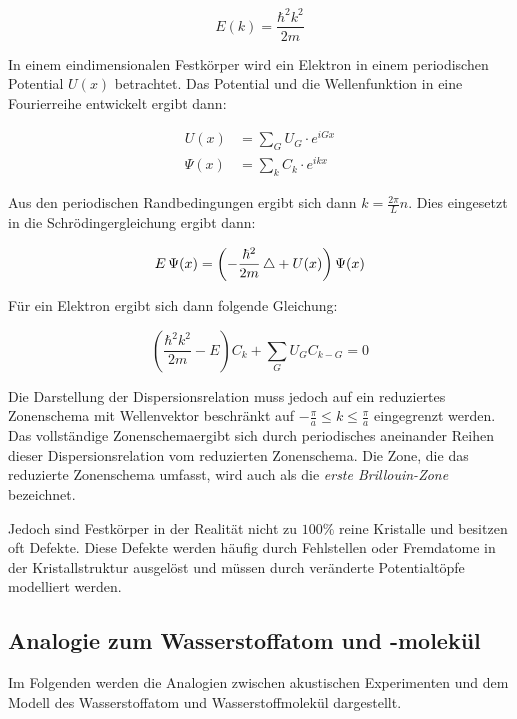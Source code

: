 \begin{equation}
    E(k) = \frac{\hbar^2 k^2}{2 m}
    \label{eqn:disp}
\end{equation}

In einem eindimensionalen Festkörper wird ein Elektron in einem periodischen Potential $U(x)$ betrachtet. Das Potential und die Wellenfunktion in eine Fourierreihe entwickelt ergibt dann:

\begin{align}
    U (x) &= \sum_G U_G \cdot e^{iGx} \\
    \Psi (x) &= \sum_k C_k \cdot e^{ikx}
\end{align}

Aus den periodischen Randbedingungen ergibt sich dann $k = \frac{2 \pi}{L} n$. Dies eingesetzt in die Schrödingergleichung ergibt dann:

\begin{equation}
    E \, \Psi (x) = \left( - \frac{\hbar^2}{2m} \mathop{}\!\mathbin\bigtriangleup + U (x) \right) \Psi (x)
    \label{eqn:fest_schroed}
\end{equation}

Für ein Elektron ergibt sich dann folgende Gleichung:

\begin{equation}
    \left( \frac{\hbar^2 k^2}{2m} - E \right) C_k + \sum_G U_G C_{k-G} = 0
    \label{eqn:fest_el}
\end{equation}

Die Darstellung der Dispersionsrelation muss jedoch auf ein reduziertes Zonenschema mit Wellenvektor beschränkt auf $- \frac{\pi}{a} \leq k \leq \frac{\pi}{a}$ eingegrenzt werden. Das vollständige Zonenschemaergibt sich durch periodisches aneinander Reihen dieser Dispersionsrelation vom reduzierten Zonenschema. Die Zone, die das reduzierte Zonenschema umfasst, wird auch als die \textit{erste Brillouin-Zone} bezeichnet.

Jedoch sind Festkörper in der Realität nicht zu $100 \%$ reine Kristalle und besitzen oft Defekte. Diese Defekte werden häufig durch Fehlstellen oder Fremdatome in der Kristallstruktur ausgelöst und müssen durch veränderte Potentialtöpfe modelliert werden.

\subsection{Analogie zum Wasserstoffatom und -molekül}
\label{sec:analogien}

Im Folgenden werden die Analogien zwischen akustischen Experimenten und dem Modell des Wasserstoffatom und Wasserstoffmolekül dargestellt. 


